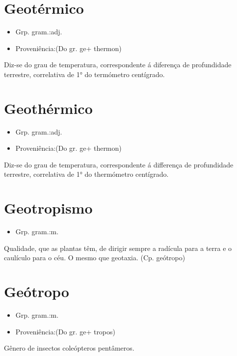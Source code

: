 \section{Geotérmico}
\begin{itemize}
\item {Grp. gram.:adj.}
\end{itemize}
\begin{itemize}
\item {Proveniência:(Do gr. \textunderscore ge\textunderscore  + \textunderscore thermon\textunderscore )}
\end{itemize}
Diz-se do grau de temperatura, correspondente á diferença de profundidade terrestre, correlativa de 1° do termómetro centígrado.
\section{Geothérmico}
\begin{itemize}
\item {Grp. gram.:adj.}
\end{itemize}
\begin{itemize}
\item {Proveniência:(Do gr. \textunderscore ge\textunderscore  + \textunderscore thermon\textunderscore )}
\end{itemize}
Diz-se do grau de temperatura, correspondente á differença de profundidade terrestre, correlativa de 1° do thermómetro centígrado.
\section{Geotropismo}
\begin{itemize}
\item {Grp. gram.:m.}
\end{itemize}
Qualidade, que as plantas têm, de dirigir sempre a radícula para a terra e o caulículo para o céu.
O mesmo que \textunderscore geotaxia\textunderscore .
(Cp. \textunderscore geótropo\textunderscore )
\section{Geótropo}
\begin{itemize}
\item {Grp. gram.:m.}
\end{itemize}
\begin{itemize}
\item {Proveniência:(Do gr. \textunderscore ge\textunderscore  + \textunderscore tropos\textunderscore )}
\end{itemize}
Gênero de insectos coleópteros pentâmeros.
